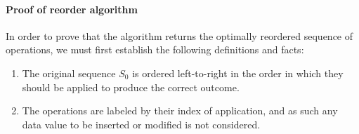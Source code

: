 \paragraph {Proof of reorder algorithm}
In order to prove that the algorithm returns the optimally reordered sequence of
operations, we must first establish the following definitions and facts:
\begin{enumerate}

  \item The original sequence $S_0$ is ordered left-to-right in the order in
  which they should be applied to produce the correct outcome.

  \item The operations are labeled by their index of application, and as such
  any data value to be inserted or modified is not considered.

\end{enumerate}



